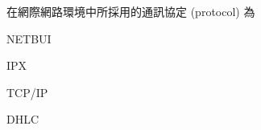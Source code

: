 \ifx\ntpcNinetyTwo\undefined[92學年基北區] \fi
在網際網路環境中所採用的通訊協定 (protocol) 為
  \begin{optionlist}
  \item NETBUI
  \item IPX
  \item TCP/IP\label{ntpc-92-a21}
  \item DHLC
  \end{optionlist}